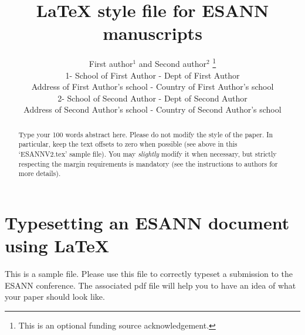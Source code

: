 \documentclass{esannV2}
\begin{document}
\title{LaTeX style file for ESANN manuscripts}

\author{First author$^1$ and Second author$^2$
%
\thanks{This is an optional funding source acknowledgement.}
%
\vspace{.3cm}\\
%
1- School of First Author - Dept of First Author \\
Address of First Author's school - Country of First Author's
school
%
\vspace{.1cm}\\
2- School of Second Author - Dept of Second Author \\
Address of Second Author's school - Country of Second Author's school\\
}

\maketitle

\begin{abstract}
Type your 100 words abstract here. Please do not modify the style
of the paper. In particular, keep the text offsets to zero when
possible (see above in this `ESANNV2.tex' sample file). You may
\emph{slightly} modify it when necessary, but strictly respecting
the margin requirements is mandatory (see the instructions to
authors for more details).
\end{abstract}

\section{Typesetting an ESANN document using \LaTeX}

This is a sample file. Please use this file to correctly typeset a
submission to the ESANN conference. The associated pdf file will
help you to have an idea of what your paper should look like.
\end{document}
